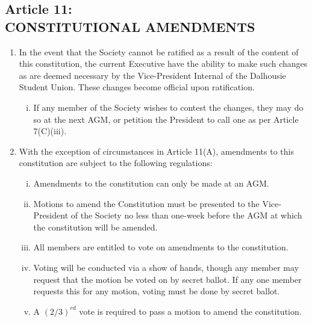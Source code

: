 \documentclass[]{report}
\begin{document}
\clearpage
\begin{center}
	\section*{Article 11:\\CONSTITUTIONAL AMENDMENTS}
	\vspace{12px}
\end{center}
\label{amendments}

	\renewcommand{\theenumi}{\Alph{enumi}}
	\begin{enumerate}
	
		\item In the event that the Society cannot be ratified as a result of the content of this constitution, the current Executive have the ability to make such changes as are deemed necessary by the Vice-President Internal of the Dalhousie Student Union. These changes become official upon ratification.
			\begin{enumerate}[i.]
				\item If any member of the Society wishes to contest the changes, they may do so at the next AGM, or petition the President to call one as per Article 7(C)(iii).
			\end{enumerate}
		
		\item With the exception of circumstances in Article 11(A), amendments to this constitution are subject to the following regulations:
			\begin{enumerate}[i.]
				\item Amendments to the constitution can only be made at an AGM.
				\item Motions to amend the Constitution must be presented to the Vice-President of the Society no less than one-week before the AGM at which the constitution will be amended.
				\item All members are entitled to vote on amendments to the constitution.
				\item Voting will be conducted via a show of hands, though any member may request that the motion be voted on by secret ballot. If any one member requests this for any motion, voting must be done by secret ballot.
				\item A $ (2/3)^{rd} $ vote is required to pass a motion to amend the constitution.
			\end{enumerate}
	
	\end{enumerate}
\end{document}
